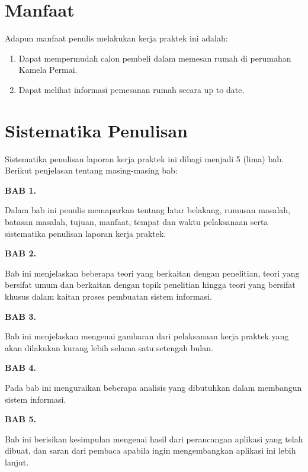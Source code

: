 \section{Manfaat}
Adapun manfaat penulis melakukan kerja praktek ini adalah:

\begin{enumerate}
  \item Dapat mempermudah calon pembeli dalam memesan rumah di perumahan Kamela Permai.
  \item Dapat melihat informasi pemesanan rumah secara up to date.
\end{enumerate}

\section{Sistematika Penulisan}
Sistematika penulisan laporan kerja praktek ini dibagi menjadi 5 (lima) bab. Berikut penjelasan tentang masing-masing bab:

\textbf{BAB 1. \babSatu}

Dalam bab ini penulis memaparkan tentang latar belakang, rumusan masalah, batasan masalah, tujuan, manfaat, tempat dan waktu pelaksanaan serta sistematika penulisan laporan kerja praktek.

\textbf{BAB 2. \babDua}

Bab ini menjelaskan beberapa teori yang berkaitan dengan penelitian, teori yang bersifat umum dan berkaitan dengan topik penelitian hingga teori yang bersifat khusus dalam kaitan proses pembuatan sistem informasi.

\textbf{BAB 3. \babTiga}

Bab ini menjelaskan mengenai gambaran dari pelaksanaan kerja praktek yang akan dilakukan kurang lebih selama satu setengah bulan.


\textbf{BAB 4. \babEmpat}

Pada bab ini menguraikan beberapa analisis yang dibutuhkan dalam membangun sistem informasi.

\textbf{BAB 5. \babLima}

Bab ini berisikan kesimpulan mengenai hasil dari perancangan aplikasi yang telah dibuat, dan saran dari pembaca apabila ingin mengembangkan aplikasi ini lebih lanjut.

